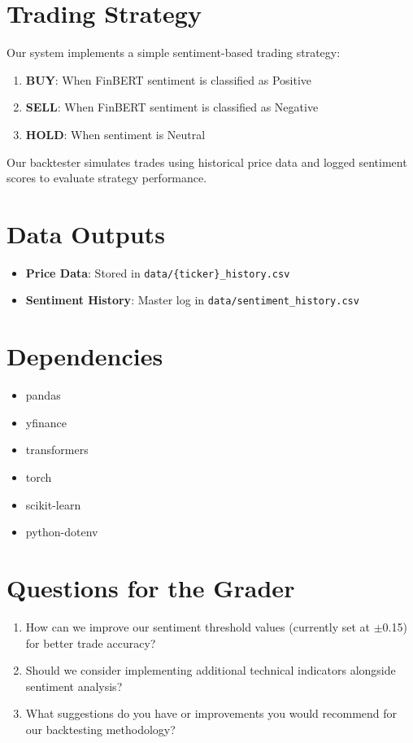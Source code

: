 \documentclass[12pt]{article}
\begin{document}
\section*{Trading Strategy}

Our system implements a simple sentiment-based trading strategy:

\begin{enumerate}
\item \textbf{BUY}: When FinBERT sentiment is classified as Positive
\item \textbf{SELL}: When FinBERT sentiment is classified as Negative
\item \textbf{HOLD}: When sentiment is Neutral
\end{enumerate}

Our backtester simulates trades using historical price data and logged sentiment scores to evaluate strategy performance.

\section*{Data Outputs}

\begin{itemize}
\item \textbf{Price Data}: Stored in \texttt{data/\{ticker\}\_history.csv}
\item \textbf{Sentiment History}: Master log in \texttt{data/sentiment\_history.csv}
\end{itemize}

\section*{Dependencies}

\begin{itemize}
\item pandas
\item yfinance
\item transformers
\item torch
\item scikit-learn
\item python-dotenv
\end{itemize}

\section*{Questions for the Grader}

\begin{enumerate}
\item How can we improve our sentiment threshold values (currently set at $\pm$0.15) for better trade accuracy?
\item Should we consider implementing additional technical indicators alongside sentiment analysis?
\item What suggestions do you have or improvements you would recommend for our backtesting methodology?
\end{enumerate}
\end{document}
